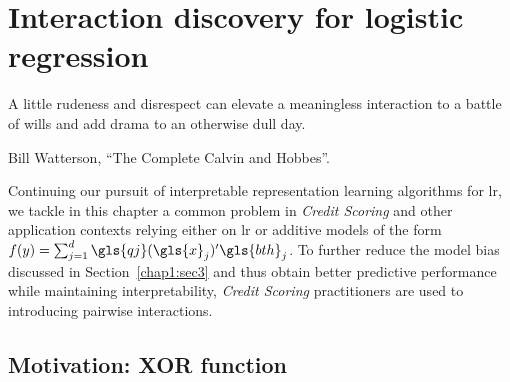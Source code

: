 \chapter{Interaction discovery for logistic regression} \label{chap5}


\epigraph{A little rudeness and disrespect can elevate a meaningless interaction to a battle of wills and add drama to an otherwise dull day.}{Bill Watterson, ``The Complete Calvin and Hobbes''.}

\minitoc


\bigskip

Continuing our pursuit of interpretable representation learning algorithms for \gls{lr}, we tackle in this chapter a common problem in \textit{Credit Scoring} and other application contexts relying either on \gls{lr} or additive models of the form $f(y) = \sum_{j=1}^d \gls{qj}(\gls{x}_j)' \gls{bth}_j$. To further reduce the model bias discussed in Section~\ref{chap1:sec3} and thus obtain better predictive performance while maintaining interpretability, \textit{Credit Scoring} practitioners are used to introducing pairwise interactions.


\section{Motivation: XOR function} \label{sec:xor}

